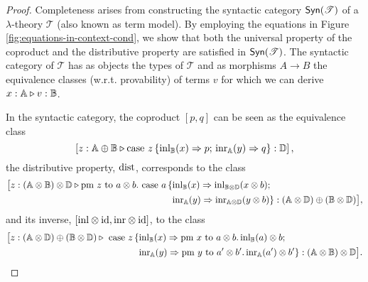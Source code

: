 \documentclass[10pt,a4paper]{amsart}
\theoremstyle{definition}
\theoremstyle{definition}
\theoremstyle{definition}
\theoremstyle{definition}
\theoremstyle{definition}
\theoremstyle{definition}
\begin{document}
\begin{proof}
  Completeness arises from constructing the syntactic category $\mathsf{Syn}(\mathscr{T})$ of a $\lambda$-theory $\mathscr{T}$ (also known as term model). By employing the equations in Figure \ref{fig:equations-in-context-cond}, we show that both the universal property of the coproduct and the distributive property are satisfied in $\mathsf{Syn}(\mathscr{T})$. The syntactic category of $\mathscr{T}$ has as objects the types of $\mathscr{T}$ and as morphisms $A \rightarrow B$ the equivalence classes (w.r.t. provability) of terms $v$ for which we can derive $x : \mathbb{A} \triangleright v : \mathbb{B}$.

  In the syntactic category, the coproduct $[ p ,  q]$ can be seen as the equivalence
  class 
  $$\left[z:\mathbb{A} \oplus\mathbb{B} \triangleright \text{case } z\,\{\mathrm{inl}_{\mathbb{B}}(x) \Rightarrow p ; \, \mathrm{inr}_{\mathbb{A}}(y) \Rightarrow q\}: \mathbb{D}\right],$$ 
  the distributive property, $\mathrm{dist}$, corresponds to the class 
  \begin{align*}
    \big[z:(\mathbb{A} \otimes \mathbb{\mathbb{B}}) \otimes \mathbb{\mathbb{D}} \triangleright \text{pm } z \text{ to } a \otimes b. \text{ case } a\,\{ &\mathrm{inl}_{\mathbb{B}}(x) \Rightarrow \mathrm{inl}_{\mathbb{B} \otimes \mathbb{D}}(x \otimes b); \\
    & \mathrm{inr}_{\mathbb{A}}(y) \Rightarrow \mathrm{inr}_{\mathbb{A} \otimes \mathbb{D}} (y \otimes b)\}: (\mathbb{A} \otimes \mathbb{D}) \oplus (\mathbb{B} \otimes \mathbb{D})\big],
  \end{align*}
and its inverse, $[\mathrm{inl} \otimes \mathrm{id}, \mathrm{inr} \otimes \mathrm{id}]$, to the class
\begin{align*}
  \big[z: (\mathbb{A} \otimes \mathbb{D}) \oplus (\mathbb{B} \otimes \mathbb{D}) \triangleright  \text{ case } z \,\{ &\mathrm{inl}_{\mathbb{B}}(x) \Rightarrow \text{pm } x \text{ to } a \otimes b. \, \mathrm{inl}_{\mathbb{B}}(a) \otimes b; \\
  & \mathrm{inr}_{\mathbb{A}}(y) \Rightarrow \text{pm } y \text{ to } a' \otimes b'. \, \mathrm{inr}_{\mathbb{A}}(a') \otimes b'\}: (\mathbb{A} \otimes \mathbb{\mathbb{B}}) \otimes \mathbb{\mathbb{D}}\big].
\end{align*}



\end{proof}
\end{document}
